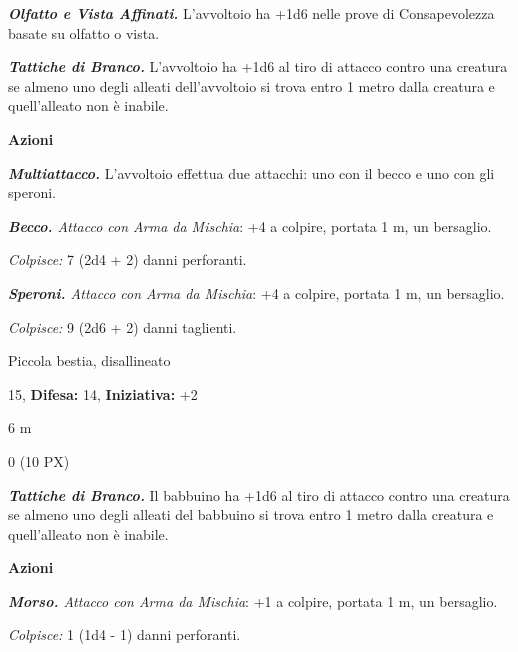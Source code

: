 \begin{multicols}{2}
{\emph{\textbf{Olfatto e Vista Affinati.}} L'avvoltoio ha +1d6 nelle prove di Consapevolezza basate su olfatto o vista.

\emph{\textbf{Tattiche di Branco.}} L'avvoltoio ha +1d6 al tiro di attacco contro una creatura se almeno uno degli alleati dell'avvoltoio si trova entro 1 metro dalla creatura e quell'alleato non è inabile.

\textbf{Azioni}

\emph{\textbf{Multiattacco.}} L'avvoltoio effettua due attacchi: uno con il becco e uno con gli speroni.

\emph{\textbf{Becco.} Attacco con Arma da Mischia}: +4 a colpire, portata 1 m, un bersaglio.

\emph{Colpisce:} 7 (2d4 + 2) danni perforanti.

\emph{\textbf{Speroni.} Attacco con Arma da Mischia}: +4 a colpire, portata 1 m, un bersaglio.

\emph{Colpisce:} 9 (2d6 + 2) danni taglienti.

\begin{description}[noitemsep, topsep=0pt, parsep=0pt, partopsep=0pt, leftmargin=0cm, labelwidth=2.2cm]
	\item[\textbf{Taglia/Tipo:}] Piccola bestia, disallineato
	\item[\textbf{Caratt.:}] 
	\item[\textbf{Punti Ferita:}] 15,  \textbf{Difesa:} 14,  \textbf{Iniziativa:} +2
	\item[\textbf{Tiri Salvez.:}] 
	\item[\textbf{Movimento:}] 6 m
	\item[\textbf{Sfida:}] 0 (10 PX)\smallskip
\end{description}

\emph{\textbf{Tattiche di Branco.}} Il babbuino ha +1d6 al tiro di attacco contro una creatura se almeno uno degli alleati del babbuino si trova entro 1 metro dalla creatura e quell'alleato non è inabile.

\textbf{Azioni}

\emph{\textbf{Morso.} Attacco con Arma da Mischia}: +1 a colpire, portata 1 m, un bersaglio.

\emph{Colpisce:} 1 (1d4 - 1) danni perforanti.

}
\end{multicols}
